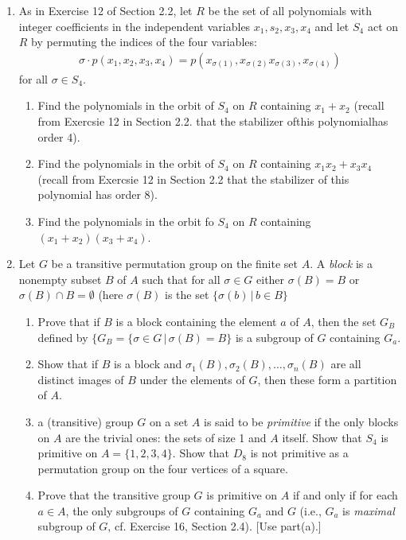 \documentclass[10pt,a4paper]{report}
\begin{document}
\begin{enumerate}
	\item As in Exercise 12 of Section 2.2, let $R$ be the set of all polynomials with integer coefficients in the independent variables $x_1,s_2,x_3, x_4$ and let $S_4$ act on $R$ by permuting the indices of the four variables:
	\begin{align*}
		\sigma \cdot p(x_1,x_2,x_3,x_4) = p(x_{\sigma(1)},x_{\sigma(2)}x_{\sigma(3)},x_{\sigma(4)})
	\end{align*}for all $\sigma \in S_4$.
	\begin{enumerate}
		\item Find the polynomials in the orbit of $S_4$ on $R$ containing $x_1+x_2$ (recall from Exercsie 12 in Section 2.2. that the stabilizer ofthis polynomialhas order 4).
		\item Find the polynomials in the orbit of $S_4$ on $R$ containing $x_1x_2+x_3x_4$ (recall from Exercsie 12 in Section 2.2 that the stabilizer of this polynomial has order 8).
		\item Find the polynomials in the orbit fo $S_4$ on $R$ containing $(x_1+x_2)(x_3+x_4)$.
	\end{enumerate}
	
	\item Let $G$ be a transitive permutation group on the finite set $A$. A \textit{block} is a nonempty subset $B$ of $A$ such that for all $\sigma \in G$ either $\sigma(B)=B$ or $\sigma(B)\cap B = \emptyset$ (here $\sigma(B)$ is the set $\{\sigma(b) \,|\,b\in B\}$
	\begin{enumerate}
		\item Prove that if $B$ is a block containing the element $a$ of $A$, then the set $G_B$ defined by $\{G_B = \{\sigma\in G\,|\, \sigma(B)=B\}$ is a subgroup of $G$ containing $G_a$.
		\item Show that if $B$ is a block and $\sigma_1(B), \sigma_2(B),\dots,\sigma_n(B)$ are all distinct images of $B$ under the elements of $G$, then these form a partition of $A$.
		\item a (transitive) group $G$ on a set $A$ is said to be \textit{primitive} if the only blocks on $A$ are the trivial ones: the sets of size 1 and $A$ itself.  Show that $S_4$ is primitive on $A=\{1,2,3,4\}$.  Show that $D_8$ is not primitive as a permutation group on the four vertices of a square.
		\item Prove that the transitive group $G$ is primitive on $A$ if and only if for each $a \in A$, the only subgroups of $G$ containing $G_a$ and $G$ (i.e., $G_a$ is \textit{maximal} subgroup of $G$, cf. Exercise 16, Section 2.4). [Use part(a).]
	\end{enumerate}
	

\end{enumerate}
\end{document}
